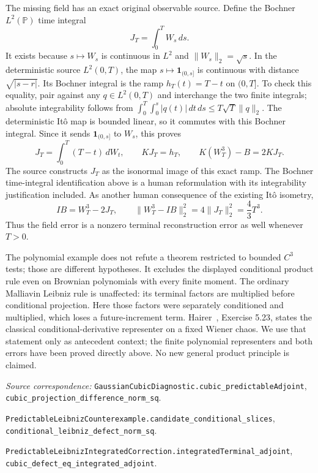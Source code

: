 \documentclass[11pt]{article}
\newcommand{\ind}{\mathbf1}
\begin{document}
The missing field has an exact original observable source. Define
the Bochner $L^2(\mathbb P)$ time integral
\[
 J_T=\int_0^T W_s\,ds.
\]
It exists because $s\mapsto W_s$ is continuous in $L^2$ and
$\|W_s\|_2=\sqrt{s}$. In the deterministic source
$L^2(0,T)$, the map $s\mapsto\ind_{(0,s]}$ is continuous with
distance $\sqrt{|s-r|}$. Its Bochner integral is the ramp
$h_T(t)=T-t$ on $(0,T]$. To check this equality, pair against
any $q\in L^2(0,T)$ and interchange the two finite integrals;
absolute integrability follows from
$\int_0^T\int_0^s|q(t)|\,dt\,ds
\leq T\sqrt T\|q\|_2$.
The deterministic It\^o map is bounded linear, so it commutes
with this Bochner integral. Since it sends $\ind_{(0,s]}$ to
$W_s$, this proves
\begin{equation}\label{eq:rampcorrection}
 J_T=\int_0^T(T-t)\,dW_t,\qquad KJ_T=h_T,\qquad
 K(W_T^3)-B=2KJ_T.
\end{equation}
The source constructs $J_T$ as the isonormal image of this exact
ramp. The Bochner time-integral identification above is a human
reformulation with its integrability justification included.
As another human consequence of the existing It\^o isometry,
\[
 I B=W_T^3-2J_T,\qquad
 \|W_T^3-I B\|_2^2=4\|J_T\|_2^2=\frac43T^3.
\]
Thus the field error is a nonzero terminal reconstruction error as
well whenever $T>0$.

The polynomial example does not refute a theorem restricted to
bounded $C^3$ tests; those are different hypotheses. It excludes
the displayed conditional product rule even on Brownian
polynomials with every finite moment. The ordinary Malliavin
Leibniz rule is unaffected: its terminal factors are multiplied
before conditional projection. Here those factors were separately
conditioned and multiplied, which loses a future-increment term.
Hairer~\cite{HairerSensitivity}, Exercise 5.23, states the classical
conditional-derivative representer on a fixed Wiener chaos.
We use that statement only as antecedent context; the finite
polynomial representers and both errors have been proved directly
above. No new general product principle is claimed.

\par\noindent\begingroup\small\raggedright
\textit{Source correspondence:}
\texttt{GaussianCubicDiagnostic.cubic\_predictableAdjoint},
\texttt{cubic\_projection\_difference\_norm\_sq}.
\par\noindent
\texttt{PredictableLeibnizCounterexample.candidate\_conditional\_slices},
\texttt{conditional\_leibniz\_defect\_norm\_sq}.
\par\noindent
\texttt{PredictableLeibnizIntegratedCorrection.integratedTerminal\_adjoint},
\texttt{cubic\_defect\_eq\_integrated\_adjoint}.
\par\endgroup
\end{document}
